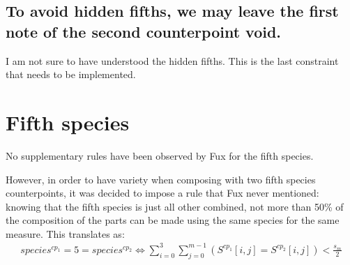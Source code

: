 \subsection{To avoid hidden fifths, we may leave the first note of the second counterpoint void.}
I am not sure to have understood the hidden fifths. This is the last constraint that needs to be implemented.

\section{Fifth species}
No supplementary rules have been observed by Fux for the fifth species.

However, in order to have variety when composing with two fifth species counterpoints, it was decided to impose a rule that Fux never mentioned: knowing that the fifth species is just all other combined, not more than 50\% of the composition of the parts can be made using the same species for the same measure. This translates as:
\begin{equation}
\begin{aligned}
species^{cp_1} = 5 = species^{cp_2}  \iff \sum_{i=0}^{3} \sum_{j=0}^{m-1} (S^{cp_1}[i,j] = S^{cp_2}[i,j]) < \frac{s_m}{2}
\end{aligned}
\end{equation}
